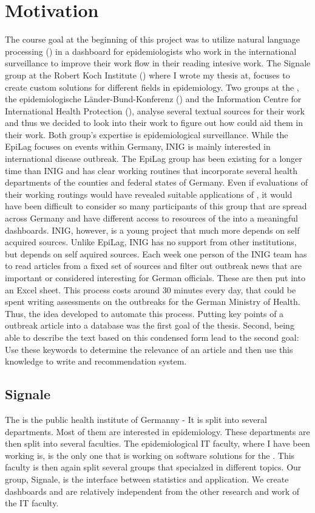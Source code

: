 \section{Motivation}
The course goal at the beginning of this project was to utilize natural language
processing () in a dashboard for epidemiologists who work in the international
surveillance to improve their work flow in their reading intesive work.
The Signale group at the Robert Koch Institute () where I wrote my thesis at, focuses to create custom solutions for different
fields in epidemiology. Two groups at the , the epidemiologische L\"ander-Bund-Konferenz ()
and the Information Centre for International Health Protection (),
analyse several textual sources for their work and thus we decided to look into their work
to figure out how  could aid them in their work. Both group’s
expertise is epidemiological surveillance. While the EpiLag focuses on events
within Germany, INIG is mainly interested in international disease outbreak. The
EpiLag group has been existing for a longer time than INIG and has clear working routines that
incorporate several health departments of the counties and federal states of Germany.
Even if evaluations of their working routings would have revealed suitable applications of , it would have
been difficult to consider so many participants of this group that are
spread across Germany and have different access to resources of the  into a meaningful dashboards.
INIG, however, is a young project that much more depends on self acquired sources. Unlike EpiLag, INIG
has no support from other institutions, but depends on self aquired sources.
Each week one person of the INIG team has to read articles from a fixed set of sources and filter out outbreak news that are
important or considered interesting for German officials. These are then put into an Excel sheet. This process costs around 30 minutes
every day, that could be spent writing assessments on the outbreaks for the
German Ministry of Health. Thus, the idea developed to automate this process. Putting key points of a outbreak article
into a database was the first goal of the thesis. Second, being able to describe the
text based on this condensed form lead to the second goal: Use these keywords
to determine the relevance of an article and then use this knowledge to write
and recommendation system.

\subsection{Signale}
The  is the public health institute of Germanny - It is
split into several departments. Most of them are interested in epidemiology.
These departments are then split into several faculties. The epidemiological IT faculty,
where I have been working is, is the only one that is working on software solutions for the .
This faculty is then again split several groups that specialzed in different topics.
Our group, Signale, is the interface between statistics and application.
We create dashboards and are relatively independent from the other research and work of the IT faculty.


